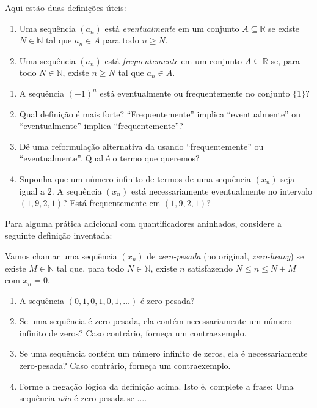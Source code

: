 \begin{exercise}\label{ex:2-2-7}
Aqui estão duas definições úteis:
\begin{enumerate}[label=(\roman*)]
\item Uma sequência $(a_n)$ está \textit{eventualmente} em um conjunto $A \subseteq \mathbb{R}$ se existe $N \in \mathbb{N}$ tal que $a_n \in A$ para todo $n \geq N$.
\item Uma sequência $(a_n)$ está \textit{frequentemente} em um conjunto $A \subseteq \mathbb{R}$ se, para todo $N \in \mathbb{N}$, existe $n \geq N$ tal que $a_n \in A$.
\end{enumerate}
\begin{enumerate}[label=\alph*)]
\item A sequência $(-1)^n$ está eventualmente ou frequentemente no conjunto $\{1\}$?
\item Qual definição é mais forte? ``Frequentemente'' implica ``eventualmente'' ou ``eventualmente'' implica ``frequentemente''?
\item Dê uma reformulação alternativa da  usando ``frequentemente'' ou ``eventualmente''. Qual é o termo que queremos?
\item Suponha que um número infinito de termos de uma sequência $(x_n)$ seja igual a $2$. A sequência $(x_n)$ está necessariamente eventualmente no intervalo $(1{,}9, 2{,}1)$? Está frequentemente em $(1{,}9, 2{,}1)$?
\end{enumerate}
\end{exercise}

\begin{exercise}\label{ex:2-2-8}
Para alguma prática adicional com quantificadores aninhados, considere a seguinte definição inventada:

Vamos chamar uma sequência $(x_n)$ de \textit{zero-pesada} (no original, \textit{zero-heavy}) se existe $M \in \mathbb{N}$ tal que, para todo $N \in \mathbb{N}$, existe $n$ satisfazendo $N \leq n \leq N + M$ com $x_n = 0$.
\begin{enumerate}[label=\alph*)]
\item A sequência $(0, 1, 0, 1, 0, 1, \dots)$ é zero-pesada?
\item Se uma sequência é zero-pesada, ela contém necessariamente um número infinito de zeros? Caso contrário, forneça um contraexemplo.
\item Se uma sequência contém um número infinito de zeros, ela é necessariamente zero-pesada? Caso contrário, forneça um contraexemplo.
\item Forme a negação lógica da definição acima. Isto é, complete a frase: Uma sequência \textit{não} é zero-pesada se $\dots$.
\end{enumerate}
\end{exercise}

